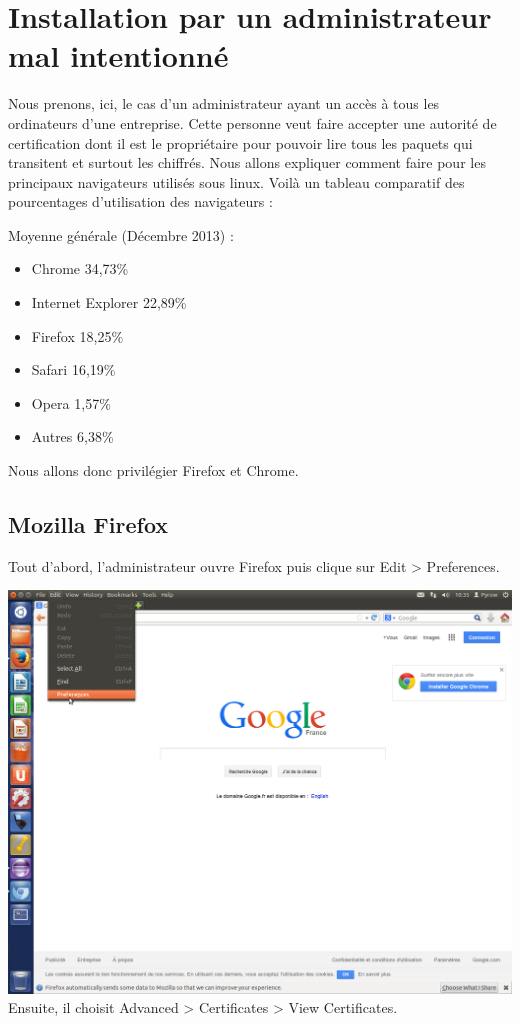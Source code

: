 \documentclass[a4paper,11pt,french]{book}
\begin{document}
\section{Installation par un administrateur mal intentionné}
Nous prenons, ici, le cas d'un administrateur ayant un accès à tous les ordinateurs d'une entreprise.
Cette personne veut faire accepter une autorité de certification dont il est le propriétaire pour pouvoir lire tous les paquets qui transitent et surtout les chiffrés.
Nous allons expliquer comment faire pour les principaux navigateurs utilisés sous linux.
Voilà un tableau comparatif des pourcentages d'utilisation des navigateurs : 

Moyenne générale (Décembre 2013) :
\begin{itemize}
\item{Chrome} 		34,73\%
\item{Internet Explorer}		 22,89\%
\item{Firefox} 		18,25\%
\item{Safari} 		16,19\%
\item{Opera}	 		1,57\%	
\item{Autres} 		6,38\%
\end{itemize}	

Nous allons donc privilégier Firefox et Chrome.
\newpage
\subsection{Mozilla Firefox}

Tout d'abord, l'administrateur ouvre Firefox puis clique sur Edit > Preferences.

\includegraphics[width=\textwidth]{images/OngletPref.png}
\newpage
Ensuite, il choisit Advanced > Certificates > View Certificates.
\end{document}
